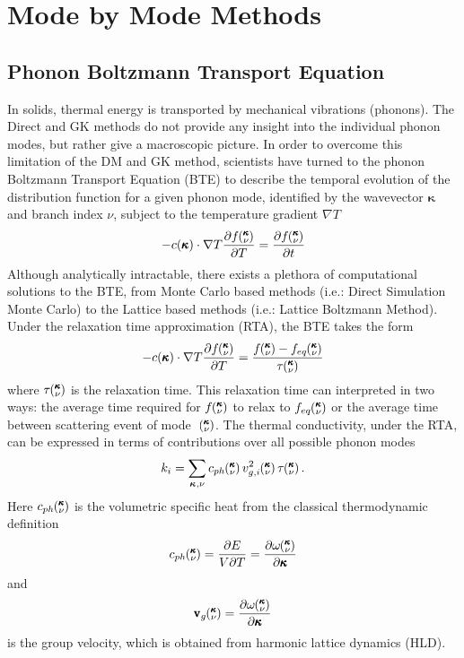 \section{Mode by Mode Methods}
\subsection{Phonon Boltzmann Transport Equation}
%
In solids, thermal energy is transported by mechanical vibrations (phonons). The Direct and GK methods do not provide any insight into the individual phonon modes, but rather give a macroscopic picture. In order to overcome this limitation of the DM and GK method, scientists have turned to the phonon Boltzmann Transport Equation (BTE) to describe the temporal evolution of the distribution function for a given phonon mode, identified by the wavevector $\pmb{\kappa}$ and branch index $\nu$, subject to the temperature gradient $\nabla T$ \cite{srivastava1990physics} 
%
\begin{equation}\label{EQ:BTE}
-c(\pmb{\kappa})\cdot \nabla T\frac{\partial f\kv}{\partial T}=\frac{\partial f\kv}{\partial t}
\end{equation}
%
Although analytically intractable, there exists a plethora of computational solutions to the BTE, from Monte Carlo based methods (i.e.: Direct Simulation Monte Carlo)\cite{mazumder2001monte} to the Lattice based methods (i.e.: Lattice Boltzmann Method)\cite{nabovati2011lattice}. Under the relaxation time approximation (RTA), the BTE takes the form
%
\begin{equation}\label{EQ:BTE_lin}
-c(\pmb{\kappa})\cdot \nabla T\frac{\partial f\kv}{\partial T}=\frac{f\kv-f_{eq}\kv}{\tau \kv}
\end{equation}
%
where $\tau \kv$ is the relaxation time. This relaxation time can interpreted in two ways: the average time required for $f\kv$ to relax to $f_{eq}\kv$ or the average time between scattering event of mode ~$\kv$. The thermal conductivity, under the RTA, can be expressed in terms of contributions over all possible phonon modes \cite{srivastava1990physics}
%
\begin{equation}\label{EQ:k_RTA}
	k_{i}= \sum_{\bm{\kappa},\nu} c_{ph}\kv v^2_{g,i}\kv\tau\kv.
\end{equation}
%
Here $c_{ph}\kv$ is the volumetric specific heat from the classical thermodynamic definition \cite{mcgaugheythesis}
%
\begin{equation}\label{EQ:Cph}
c_{ph}\kv=\frac{\partial E}{V\partial T}=\frac{\partial \omega \kv}{\partial \pmb{\kappa}}
\end{equation}
%
and
\begin{equation}\label{EQ:Vg}
\pmb{\mathrm{v}}_{g}\kv=\frac{\partial \omega \kv}{\partial \pmb{\kappa}}
\end{equation}
is the group velocity, which is obtained from harmonic lattice dynamics (HLD).

